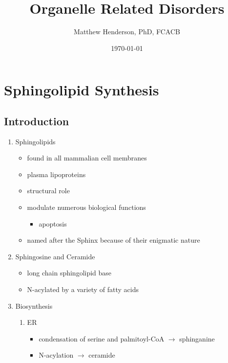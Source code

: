\documentclass{scrartcl}
\author{Matthew Henderson, PhD, FCACB}
\date{\today}
\title{Organelle Related Disorders}
\begin{document}
\maketitle
\tableofcontents


\section{Sphingolipid Synthesis}
\label{sec:org551648a}
\subsection{Introduction}
\label{sec:org6149615}
\begin{enumerate}
\item Sphingolipids
\label{sec:org95d73f8}
\begin{itemize}
\item found in all mammalian cell membranes
\item plasma lipoproteins
\item structural role
\item modulate numerous biological functions
\begin{itemize}
\item apoptosis
\end{itemize}
\item named after the Sphinx because of their enigmatic nature
\end{itemize}

\item Sphingosine and Ceramide
\label{sec:orgcda7b52}

\begin{itemize}
\item long chain sphingolipid base
\item N-acylated by a variety of fatty acids
\end{itemize}


\item Biosynthesis
\label{sec:org855951f}
\begin{enumerate}
\item ER
\label{sec:org926a8e9}
\begin{itemize}
\item condensation of serine and palmitoyl-CoA \(\to\) sphinganine
\item N-acylation \(\to\) ceramide
\end{itemize}


\end{enumerate}
\end{enumerate}
\end{document}
